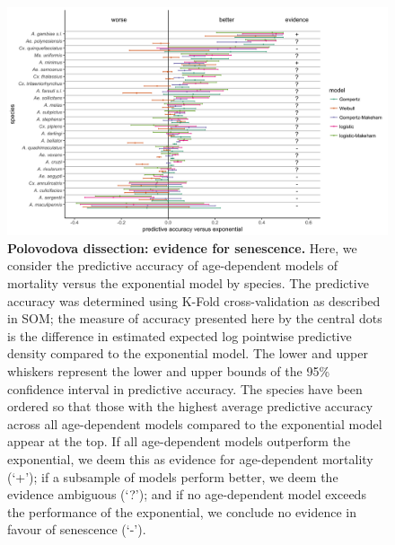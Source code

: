 \documentclass[12pt]{article}
\begin{document}
\begin{figure}[ht]
	\centerline{\includegraphics[width=1.25\textwidth]{./Figure_files/elpd_vs_exponential_ordered_dissection.png}}
	\caption{\textbf{Polovodova dissection: evidence for senescence.}  Here, we consider the predictive accuracy of age-dependent models of mortality versus the exponential model by species. The predictive accuracy was determined using K-Fold cross-validation as described in SOM; the measure of accuracy presented here by the central dots is the difference in estimated expected log pointwise predictive density compared to the exponential model. The lower and upper whiskers represent the lower and upper bounds of the 95\% confidence interval in predictive accuracy. The species have been ordered so that those with the highest average predictive accuracy across all age-dependent models compared to the exponential model appear at the top. If all age-dependent models outperform the exponential, we deem this as evidence for age-dependent mortality (`+'); if a subsample of models perform better, we deem the evidence ambiguous (`?'); and if no age-dependent model exceeds the performance of the exponential, we conclude no evidence in favour of senescence (`-').}
	\label{fig:dissection_senescence}
\end{figure}
\end{document}
